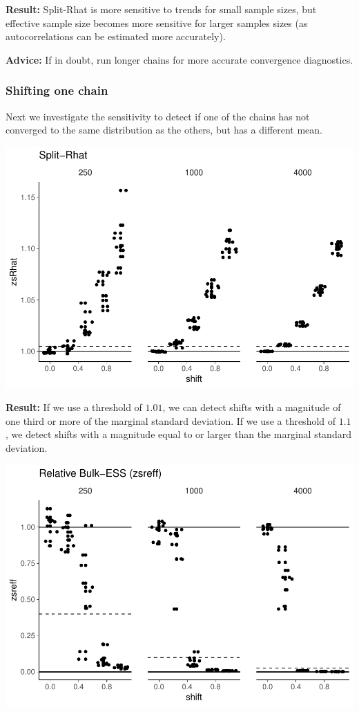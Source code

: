 \documentclass[american,]{article}
\begin{document}
\textbf{Result:} Split-Rhat is more sensitive to trends for small sample
sizes, but effective sample size becomes more sensitive for larger
samples sizes (as autocorrelations can be estimated more accurately).

\textbf{Advice:} If in doubt, run longer chains for more accurate
convergence diagnostics.

\hypertarget{shifting-one-chain}{%
\subsubsection*{Shifting one chain}\label{shifting-one-chain}}

Next we investigate the sensitivity to detect if one of the chains has
not converged to the same distribution as the others, but has a
different mean.

\includegraphics{graphics/zsrhat-shifted-chain-1.pdf}

\textbf{Result:} If we use a threshold of \(1.01\), we can detect shifts
with a magnitude of one third or more of the marginal standard
deviation. If we use a threshold of \(1.1\), we detect shifts with a
magnitude equal to or larger than the marginal standard deviation.

\includegraphics{graphics/zsreff-shifted-chain-1.pdf}
\end{document}
